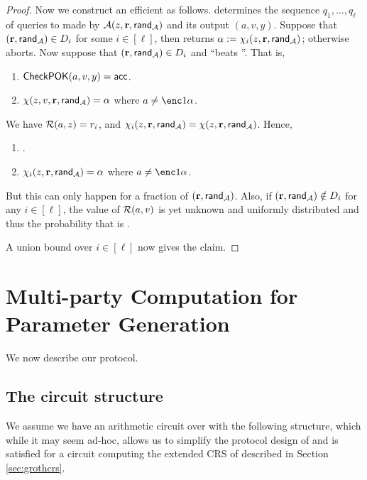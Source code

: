 \documentclass{article}
\begin{document}
\begin{claim}
\begin{proof}
 Now we construct an efficient \ext as follows.
 \ext determines the sequence $q_1,\ldots,q_\ell$ of queries to \RO made by $\mathcal{A}(z,\textbf{r},\mathsf{rand_{\mathcal{A}}})$ and its output $(a,v,y)$.
 Suppose that $(\textbf{r},\mathsf{rand_{\mathcal{A}}})\in D_i$ for some $i\in [\ell]$, then \ext returns $\alpha:= \chi_i(z,\textbf{r},\mathsf{rand_{\mathcal{A}}})$; otherwise \ext aborts.
Now suppose that $(\textbf{r},\mathsf{rand_{\mathcal{A}}})\in D_i$ and ``\adv beats \ext''.
That is, 
  \begin{enumerate}
  \item $\mathsf{CheckPOK}(a,v,y)=\mathsf{acc}$. 
  \item $\chi(z,v,\textbf{r},\mathsf{rand_{\mathcal{A}}})=\alpha$ where $a\neq \enc1{\alpha}$.
   \end{enumerate}
We have ${\cal R}(a,z) = r_i$, and $\chi_i(z,\textbf{r},\mathsf{rand_{\mathcal{A}}}) = \chi(z,\textbf{r},\mathsf{rand_{\mathcal{A}}})$.
Hence,
\begin{enumerate}
 \item {}.
 \item $\chi_i(z,\textbf{r},\mathsf{rand_{\mathcal{A}}})=\alpha$ where $a\neq \enc1{\alpha}$.
\end{enumerate}

But this can only happen for a \negl fraction of $(\textbf{r},\mathsf{rand_{\mathcal{A}}})$.
Also, if $(\textbf{r},\mathsf{rand_{\mathcal{A}}})\notin D_i$ for any $i\in [\ell]$, the value of ${\cal R}(a,v)$ is yet unknown and uniformly distributed
and thus the probability that  is \negl.

A union bound over $i\in [\ell]$ now gives the claim.
 \end{proof}


\end{claim}

\section{Multi-party Computation for Parameter Generation }\label{sec:mpc}
We now describe our protocol.

\subsection{The circuit structure}\label{subsec:circ_structure}
We assume we have an arithmetic circuit \circ over \F with the following structure, which while it may seem ad-hoc, allows us to simplify the protocol design of \cite{BCGTV15} and
 is satisfied for a circuit computing the extended CRS of \cite{Groth16} described in Section \ref{sec:grothcrs}.
\end{document}
